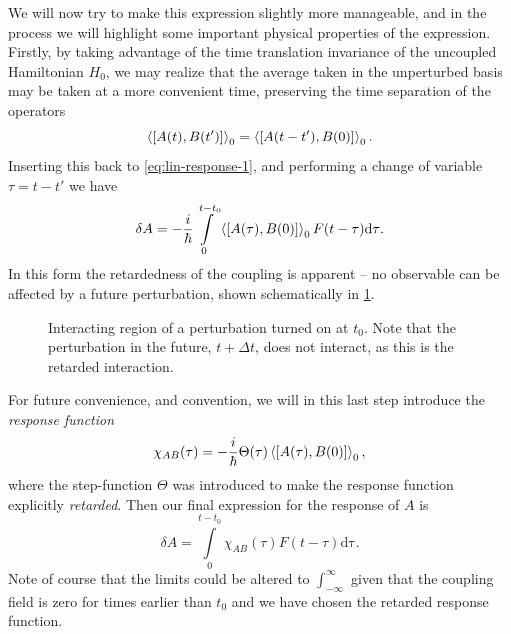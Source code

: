 We will now try to make this expression slightly more manageable, and in the process we will highlight some important physical properties of the expression.
Firstly, by taking advantage of the time translation invariance of the uncoupled Hamiltonian $H_0$, we may realize that the average taken in the unperturbed basis may be taken at a more convenient time, preserving the time separation of the operators
\begin{equation}
  \Braket{\left[
      {A}(t), {B}(t')
    \right]}_0
=
\Braket{\left[
    {A}(t-t'), {B}(0)
    \right]}_0.
\end{equation}
Inserting this back to \cref{eq:lin-response-1}, and performing a change of variable $\tau = t  - t'$ we have
\begin{equation}
\label{eq:13}
\delta {A} = -\frac{i}{\hbar} \int\limits_{0}^{t-t_0}
\Braket{\left[
    {A}(\tau), {B}(0)
  \right]}_{0}
F(t - \tau) \mathrm{d\tau}.
\end{equation}
In this form the retardedness of the coupling is apparent -- no observable can be affected by a future perturbation, shown schematically in \cref{fig:interaction}.

\begin{figure}[ht]
  \centering
  \caption{Interacting region of a perturbation turned on at $t_0$. Note that the perturbation in the future, $t+\Delta t$, does not interact, as this is the retarded interaction.}
  \label{fig:interaction}
\end{figure}
For future convenience, and convention, we will in this last step introduce the \emph{response function}
\begin{equation}
\label{eq:14}
\chi_{AB}(\tau) = -\frac{i}{\hbar} \Theta(\tau)
\Braket{\left[
{A}(\tau), {B}(0)
  \right]}_0,
\end{equation}
where the step-function $\Theta$ was introduced to make the response function explicitly \emph{retarded}.
Then our final expression for the response of ${A}$ is
\begin{equation}
  \label{eq:linearResponse}
\delta {A} = \int\limits_{0}^{t-t_0}
\chi_{AB}(\tau) F(t - \tau) \mathrm{d\tau}.
\end{equation}
Note of course that the limits could be altered to $\int_{-\infty}^{\infty}$ given that the coupling field is zero for times earlier than $t_0$ and we have chosen the retarded response function.

